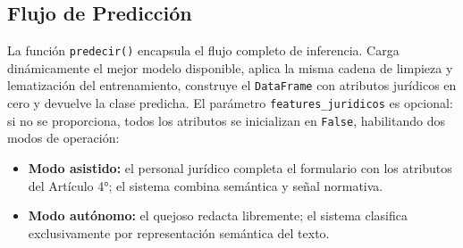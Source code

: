 \subsection{Flujo de Predicción}
\label{subsec:flujo_prediccion}

La función \texttt{predecir()} encapsula el flujo completo de inferencia.
Carga dinámicamente el mejor modelo disponible, aplica la misma cadena de
limpieza y lematización del entrenamiento, construye el \texttt{DataFrame}
con atributos jurídicos en cero y devuelve la clase predicha. El parámetro
\texttt{features\_juridicos} es opcional: si no se proporciona, todos los
atributos se inicializan en \texttt{False}, habilitando dos modos de
operación:

\begin{itemize}
  \item \textbf{Modo asistido:} el personal jurídico completa el
        formulario con los atributos del Artículo 4°; el sistema combina
        semántica y señal normativa.
  \item \textbf{Modo autónomo:} el quejoso redacta libremente; el sistema
        clasifica exclusivamente por representación semántica del texto.
\end{itemize}


